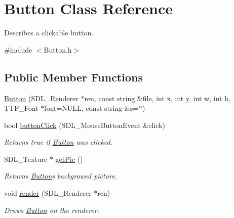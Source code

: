 \hypertarget{class_button}{}\section{Button Class Reference}
\label{class_button}


Describes a clickable button.  




{\ttfamily \#include $<$Button.\+h$>$}

\subsection*{Public Member Functions}
\begin{DoxyCompactItemize}
\item 
\hyperlink{class_button_a5d841cfdfa9ac8d1db10747ecd94dcdd}{Button} (S\+D\+L\+\_\+\+Renderer $\ast$ren, const string \&file, int x, int y, int w, int h, T\+T\+F\+\_\+\+Font $\ast$font=N\+U\+LL, const string \&s=\char`\"{}\char`\"{})
\item 
bool \hyperlink{class_button_a374d116950c2390f883088c7afb107d6}{button\+Click} (S\+D\+L\+\_\+\+Mouse\+Button\+Event \&click)\hypertarget{class_button_a374d116950c2390f883088c7afb107d6}{}\label{class_button_a374d116950c2390f883088c7afb107d6}

\begin{DoxyCompactList}\small\item\em Returns true if \hyperlink{class_button}{Button} was clicked. \end{DoxyCompactList}\item 
S\+D\+L\+\_\+\+Texture $\ast$ \hyperlink{class_button_ab22d97c11b0e63f90ef584fc9a5c0f6d}{get\+Pic} ()\hypertarget{class_button_ab22d97c11b0e63f90ef584fc9a5c0f6d}{}\label{class_button_ab22d97c11b0e63f90ef584fc9a5c0f6d}

\begin{DoxyCompactList}\small\item\em Returns \hyperlink{class_button}{Button}\textquotesingle{}s background picture. \end{DoxyCompactList}\item 
void \hyperlink{class_button_a599b95776f845111b8245ff15c13f2f1}{render} (S\+D\+L\+\_\+\+Renderer $\ast$ren)\hypertarget{class_button_a599b95776f845111b8245ff15c13f2f1}{}\label{class_button_a599b95776f845111b8245ff15c13f2f1}

\begin{DoxyCompactList}\small\item\em Draws \hyperlink{class_button}{Button} on the renderer. \end{DoxyCompactList}\end{DoxyCompactItemize}

